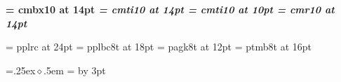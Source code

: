 \def\name{Edward Ross}
\def\addrone{}
\def\addrtwo{}
\def\github{github.com/EdwardJRoss/}
\def\githuburl{https://github.com/EdwardJRoss/}
\def\phone{0403 995 808}
\def\email{edward@skeptric.com}
\def\website{https://skeptric.com}

\font\bf = cmbx10 at 14pt
\font\it = cmti10 at 14pt
\font\smallit = cmti10 at 10pt
\font\rm = cmr10 at 14pt

\def\nameReference#1{{\it #1}}

\font\titleFont = pplrc at 24pt
\font\headFont = pplbc8t at 18pt
\font\infoFont = pagk8t at 12pt
\font\sectionFont = ptmb8t at 16pt


\parskip=0pt
\parindent=0pt

\def\head#1{\vskip2pt\hfil\headFont #1\hfill\vskip3pt}

\def\startSkill{\relax}
\def\skill#1{\rm {\vskip20pt {\sectionFont #1}}\vskip6pt}
\def\endSkill{\relax}

\def\bullet{\leavevmode\raise .25ex\hbox{$\diamond$}\kern.5em}
\newdimen\bulletSize
{}=\hbox{\bullet}
\bulletSize=
\advance\bulletSize by 3pt
\def\expTitle#1{\rm{\sectionFont #1}\par\nobreak}
\def\expRole#1#2{\vskip1pt\nobreak #2 \hfill {#1}\par\nobreak}
\def\expContent{\vskip3.5pt\nobreak\leftskip=0mm\parskip=1pt}
\def\startExp#1#2#3{\expTitle{#1}\expRole{#2}{#3}\expContent}
\def\exp#1{\hangindent=\bulletSize\hangafter=1%
\vskip1pt
\bullet #1 \par}
\def\endExp{\leftskip=0mm\parskip=0mm\vskip16pt}

\def\description#1{{\rm #1}}


\def\skilljump{\vskip2mm}


\def\pageHead{\hfil {\titleFont\name} \hfil
\vskip 3pt
\hrule
\vskip 5pt
{\infoFont\phone} \hfill {\infoFont\markupEmail{\email}}\par
{\infoFont\markupLink{\github}{\githuburl}} \hfill {\infoFont\markupLink{\website}{\website}}\par
\vskip 2pt}


